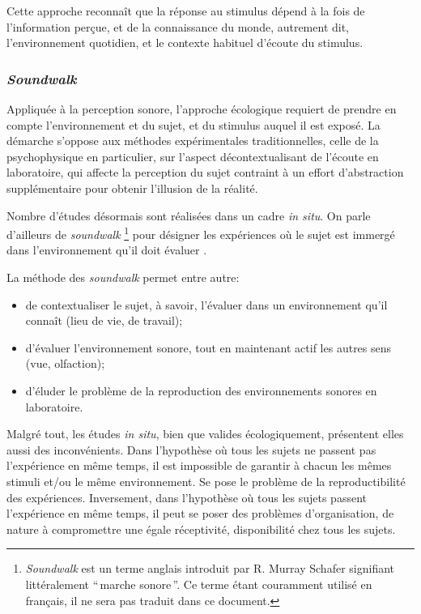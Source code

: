 Cette approche reconnaît que la réponse au stimulus dépend à la fois de l'information perçue, et de la connaissance du monde, autrement dit, l'environnement quotidien, et le contexte habituel d'écoute du stimulus.

\subsubsection{\emph{Soundwalk}}

Appliquée à la perception sonore, l'approche écologique requiert de prendre en compte l'environnement et du sujet, et du stimulus auquel il est exposé. La démarche s'oppose aux méthodes expérimentales traditionnelles, celle de la psychophysique en particulier, sur l'aspect décontextualisant de l'écoute en laboratoire, qui affecte la perception du sujet contraint à un effort d'abstraction supplémentaire pour obtenir l'illusion de la réalité.

Nombre d'études désormais sont réalisées dans un cadre \emph{in situ}. On parle d'ailleurs de \emph{soundwalk}  \footnote{\emph{Soundwalk} est un terme anglais introduit par R. Murray Schafer \citep{schafer1969new} signifiant littéralement ``\,marche sonore\,''. Ce terme étant couramment utilisé en français, il ne sera pas traduit dans ce document.} pour désigner les expériences où le sujet est immergé dans l'environnement qu'il doit évaluer \citep{adams2008soundwalking,jeon2013soundwalk}.


La méthode des \emph{soundwalk} permet entre autre:

\begin{itemize}
\item  de contextualiser le sujet, à savoir, l'évaluer dans un environnement qu'il connaît (lieu de vie, de travail);
\item d'évaluer l'environnement sonore, tout en maintenant actif les autres sens (vue, olfaction);
\item d'éluder le problème de la reproduction des environnements sonores en laboratoire.
\end{itemize}

Malgré tout, les études \emph{in situ}, bien que valides écologiquement, présentent elles aussi des inconvénients. Dans l'hypothèse où tous les sujets ne passent pas l'expérience en même temps, il est impossible de garantir à chacun les mêmes stimuli et/ou le même environnement. Se pose le problème de la reproductibilité des expériences. Inversement, dans l'hypothèse où tous les sujets passent l'expérience en même temps, il peut se poser des problèmes d'organisation, de nature à compromettre une égale réceptivité, disponibilité chez tous les sujets.

